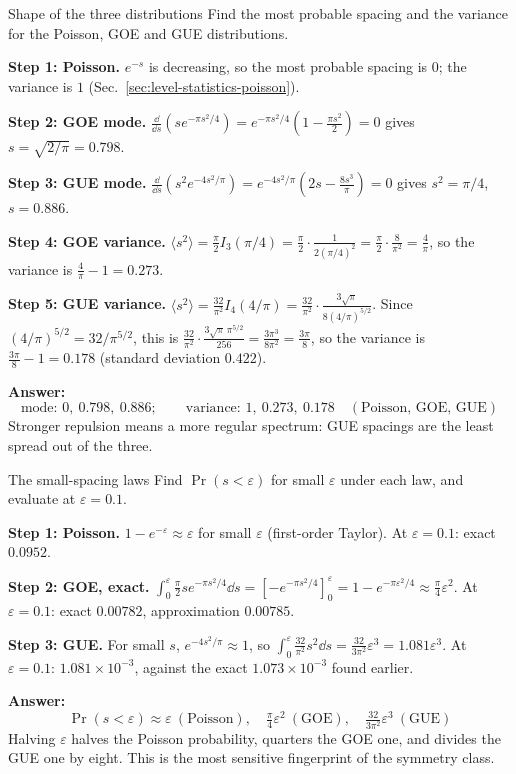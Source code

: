\begin{sample}{Shape of the three distributions}
Find the most probable spacing and the variance for the Poisson, GOE and GUE distributions.

\textbf{Step 1: Poisson.} $e^{-s}$ is decreasing, so the most probable spacing is $0$; the variance is $1$ (Sec.~\ref{sec:level-statistics-poisson}).

\textbf{Step 2: GOE mode.} $\frac{\dd}{\dd s}\left(se^{-\pi s^2/4}\right)=e^{-\pi s^2/4}\left(1-\frac{\pi s^2}{2}\right)=0$ gives $s=\sqrt{2/\pi}=0.798$.

\textbf{Step 3: GUE mode.} $\frac{\dd}{\dd s}\left(s^2e^{-4s^2/\pi}\right)=e^{-4s^2/\pi}\left(2s-\frac{8s^3}{\pi}\right)=0$ gives $s^2=\pi/4$, $s=0.886$.

\textbf{Step 4: GOE variance.} $\langle s^2\rangle=\frac\pi2 I_3(\pi/4)=\frac\pi2\cdot\frac{1}{2(\pi/4)^2}=\frac\pi2\cdot\frac{8}{\pi^2}=\frac4\pi$, so the variance is $\frac4\pi-1=0.273$.

\textbf{Step 5: GUE variance.} $\langle s^2\rangle=\frac{32}{\pi^2}I_4(4/\pi)=\frac{32}{\pi^2}\cdot\frac{3\sqrt\pi}{8(4/\pi)^{5/2}}$. Since $(4/\pi)^{5/2}=32/\pi^{5/2}$, this is $\frac{32}{\pi^2}\cdot\frac{3\sqrt\pi\,\pi^{5/2}}{256}=\frac{3\pi^3}{8\pi^2}=\frac{3\pi}{8}$, so the variance is $\frac{3\pi}8-1=0.178$ (standard deviation $0.422$).

\textbf{Answer:}
\[\boxed{\text{mode: }0,\ 0.798,\ 0.886;\qquad \text{variance: }1,\ 0.273,\ 0.178\quad(\text{Poisson, GOE, GUE})}\]
Stronger repulsion means a more regular spectrum: GUE spacings are the least spread out of the three.
\end{sample}

\begin{sample}{The small-spacing laws}
Find $\Pr(s<\varepsilon)$ for small $\varepsilon$ under each law, and evaluate at $\varepsilon=0.1$.

\textbf{Step 1: Poisson.} $1-e^{-\varepsilon}\approx\varepsilon$ for small $\varepsilon$ (first-order Taylor). At $\varepsilon=0.1$: exact $0.0952$.

\textbf{Step 2: GOE, exact.} $\int_0^\varepsilon\frac\pi2se^{-\pi s^2/4}\dd s=\left[-e^{-\pi s^2/4}\right]_0^\varepsilon=1-e^{-\pi\varepsilon^2/4}\approx\frac\pi4\varepsilon^2$. At $\varepsilon=0.1$: exact $0.00782$, approximation $0.00785$.

\textbf{Step 3: GUE.} For small $s$, $e^{-4s^2/\pi}\approx1$, so $\int_0^\varepsilon\frac{32}{\pi^2}s^2\dd s=\frac{32}{3\pi^2}\varepsilon^3=1.081\varepsilon^3$. At $\varepsilon=0.1$: $1.081\times10^{-3}$, against the exact $1.073\times10^{-3}$ found earlier.

\textbf{Answer:}
\[\boxed{\Pr(s<\varepsilon)\approx\varepsilon\ (\text{Poisson}),\quad \tfrac\pi4\varepsilon^2\ (\text{GOE}),\quad \tfrac{32}{3\pi^2}\varepsilon^3\ (\text{GUE})}\]
Halving $\varepsilon$ halves the Poisson probability, quarters the GOE one, and divides the GUE one by eight. This is the most sensitive fingerprint of the symmetry class.
\end{sample}

